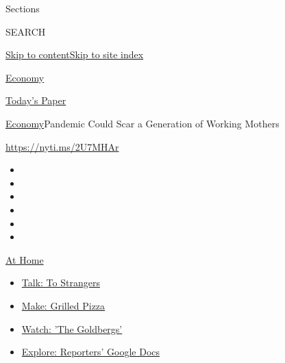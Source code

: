 Sections

SEARCH

\protect\hyperlink{site-content}{Skip to
content}\protect\hyperlink{site-index}{Skip to site index}

\href{https://www.nytimes3xbfgragh.onion/section/business/economy}{Economy}

\href{https://myaccount.nytimes3xbfgragh.onion/auth/login?response_type=cookie\&client_id=vi}{}

\href{https://www.nytimes3xbfgragh.onion/section/todayspaper}{Today's
Paper}

\href{/section/business/economy}{Economy}\textbar{}Pandemic Could Scar a
Generation of Working Mothers

\url{https://nyti.ms/2U7MHAr}

\begin{itemize}
\item
\item
\item
\item
\item
\item
\end{itemize}

\href{https://www.nytimes3xbfgragh.onion/spotlight/at-home?action=click\&pgtype=Article\&state=default\&region=TOP_BANNER\&context=at_home_menu}{At
Home}

\begin{itemize}
\tightlist
\item
  \href{https://www.nytimes3xbfgragh.onion/2020/08/03/well/family/the-benefits-of-talking-to-strangers.html?action=click\&pgtype=Article\&state=default\&region=TOP_BANNER\&context=at_home_menu}{Talk:
  To Strangers}
\item
  \href{https://www.nytimes3xbfgragh.onion/2020/08/01/at-home/coronavirus-make-pizza-on-a-grill.html?action=click\&pgtype=Article\&state=default\&region=TOP_BANNER\&context=at_home_menu}{Make:
  Grilled Pizza}
\item
  \href{https://www.nytimes3xbfgragh.onion/2020/07/31/arts/television/goldbergs-abc-stream.html?action=click\&pgtype=Article\&state=default\&region=TOP_BANNER\&context=at_home_menu}{Watch:
  'The Goldbergs'}
\item
  \href{https://www.nytimes3xbfgragh.onion/interactive/2020/at-home/even-more-reporters-editors-diaries-lists-recommendations.html?action=click\&pgtype=Article\&state=default\&region=TOP_BANNER\&context=at_home_menu}{Explore:
  Reporters' Google Docs}
\end{itemize}


